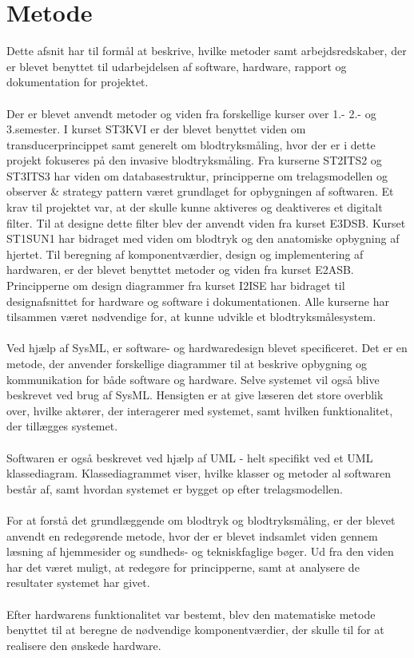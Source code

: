 \section{Metode}
Dette afsnit har til formål at beskrive, hvilke metoder samt arbejdsredskaber, der er blevet benyttet til udarbejdelsen af software, hardware, rapport og dokumentation for projektet. 
\\\\
Der er blevet anvendt metoder og viden fra forskellige kurser over 1.- 2.- og 3.semester. I kurset ST3KVI er der blevet benyttet viden om transducerprincippet samt generelt om blodtryksmåling, hvor der er i dette projekt fokuseres på den invasive blodtryksmåling. Fra kurserne ST2ITS2 og ST3ITS3 har viden om databasestruktur, principperne om trelagsmodellen og observer \& strategy pattern været grundlaget for opbygningen af softwaren. Et krav til projektet var, at der skulle kunne aktiveres og deaktiveres et digitalt filter. Til at designe dette filter blev der anvendt viden fra kurset E3DSB. Kurset ST1SUN1 har bidraget med viden om blodtryk og den anatomiske opbygning af hjertet. Til beregning af komponentværdier, design og implementering af hardwaren, er der blevet benyttet metoder og viden fra kurset E2ASB. Principperne om design diagrammer fra kurset I2ISE har bidraget til designafsnittet for hardware og software i dokumentationen. Alle kurserne har tilsammen været nødvendige for, at kunne udvikle et blodtryksmålesystem.
\\\\
Ved hjælp af SysML, er software- og hardwaredesign blevet specificeret. Det er en metode, der anvender forskellige diagrammer til at beskrive opbygning og kommunikation for både software og hardware. Selve systemet vil også blive beskrevet ved brug af SysML. Hensigten er at give læseren det store overblik over, hvilke aktører, der interagerer med systemet, samt hvilken funktionalitet, der tillægges systemet.
\\ \\
Softwaren er også beskrevet ved hjælp af UML - helt specifikt ved et UML klassediagram. Klassediagrammet viser, hvilke klasser og metoder al softwaren består af, samt hvordan systemet er bygget op efter trelagsmodellen.
\\\\
For at forstå det grundlæggende om blodtryk og blodtryksmåling, er der blevet anvendt en redegørende metode, hvor der er blevet indsamlet viden gennem læsning af hjemmesider og sundheds- og tekniskfaglige bøger. Ud fra den viden har det været muligt, at redegøre for principperne, samt at analysere de resultater systemet har givet.
\\\\
Efter hardwarens funktionalitet var bestemt, blev den matematiske metode benyttet til at beregne de nødvendige komponentværdier, der skulle til for at realisere den ønskede hardware.

